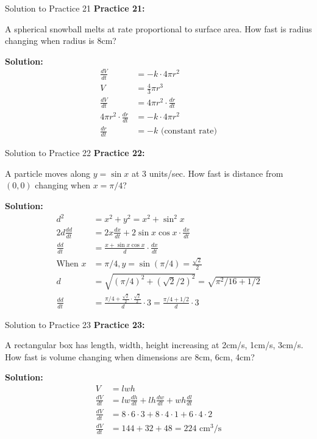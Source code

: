 \documentclass[aspectratio=169]{beamer}
\begin{document}
\begin{frame}{Solution to Practice 21}
\textbf{Practice 21:}

A spherical snowball melts at rate proportional to surface area. How fast is radius changing when radius is 8cm?

\textbf{Solution:}
\[
\begin{aligned}
  \frac{dV}{dt} &= -k \cdot 4\pi r^2 \\
  V &= \frac{4}{3}\pi r^3 \\
  \frac{dV}{dt} &= 4\pi r^2 \cdot \frac{dr}{dt} \\
  4\pi r^2 \cdot \frac{dr}{dt} &= -k \cdot 4\pi r^2 \\
  \frac{dr}{dt} &= -k \text{ (constant rate)}
\end{aligned}
\]
\end{frame}

\begin{frame}{Solution to Practice 22}
\textbf{Practice 22:}

A particle moves along $y = \sin x$ at 3 units/sec. How fast is distance from $(0,0)$ changing when $x = \pi/4$?

\textbf{Solution:}
\[
\begin{aligned}
  d^2 &= x^2 + y^2 = x^2 + \sin^2 x \\
  2d\frac{dd}{dt} &= 2x\frac{dx}{dt} + 2\sin x \cos x \cdot \frac{dx}{dt} \\
  \frac{dd}{dt} &= \frac{x + \sin x \cos x}{d} \cdot \frac{dx}{dt} \\
  \text{When } x &= \pi/4, y = \sin(\pi/4) = \frac{\sqrt{2}}{2} \\
  d &= \sqrt{(\pi/4)^2 + (\sqrt{2}/2)^2} = \sqrt{\pi^2/16 + 1/2} \\
  \frac{dd}{dt} &= \frac{\pi/4 + \frac{\sqrt{2}}{2} \cdot \frac{\sqrt{2}}{2}}{d} \cdot 3 = \frac{\pi/4 + 1/2}{d} \cdot 3
\end{aligned}
\]
\end{frame}

\begin{frame}{Solution to Practice 23}
\textbf{Practice 23:}

A rectangular box has length, width, height increasing at 2cm/s, 1cm/s, 3cm/s. How fast is volume changing when dimensions are 8cm, 6cm, 4cm?

\textbf{Solution:}
\[
\begin{aligned}
  V &= lwh \\
  \frac{dV}{dt} &= lw\frac{dh}{dt} + lh\frac{dw}{dt} + wh\frac{dl}{dt} \\
  \frac{dV}{dt} &= 8 \cdot 6 \cdot 3 + 8 \cdot 4 \cdot 1 + 6 \cdot 4 \cdot 2 \\
  \frac{dV}{dt} &= 144 + 32 + 48 = 224 \text{ cm}^3\text{/s}
\end{aligned}
\]
\end{frame}
\end{document}
